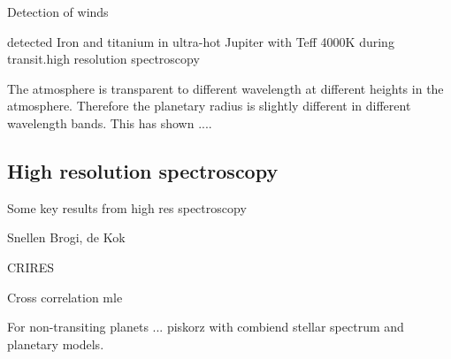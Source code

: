 Detection of winds



\citep{hoeijmakers_atomic_2018} detected Iron and titanium in ultra-hot Jupiter with Teff 4000K during transit.high resolution spectroscopy


The atmosphere is transparent to different wavelength at different heights in the atmosphere. Therefore the planetary radius is slightly different in different wavelength bands. This has shown ....



\subsection{High resolution spectroscopy}
Some key results from high res spectroscopy

Snellen  Brogi, de Kok

CRIRES  

Cross correlation mle  \citet{piskorz_evidence_2016}


For non-transiting planets ...  piskorz   with combiend stellar spectrum and planetary models.

